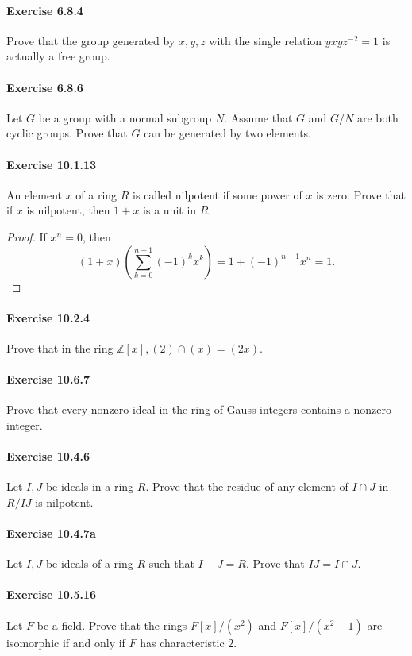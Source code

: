 \documentclass{article}
\begin{document}
\paragraph{Exercise 6.8.4} Prove that the group generated by $x, y, z$ with the single relation $y x y z^{-2}=1$ is actually a free group.


\paragraph{Exercise 6.8.6} Let $G$ be a group with a normal subgroup $N$. Assume that $G$ and $G / N$ are both cyclic groups. Prove that $G$ can be generated by two elements.


\paragraph{Exercise 10.1.13} An element $x$ of a ring $R$ is called nilpotent if some power of $x$ is zero. Prove that if $x$ is nilpotent, then $1+x$ is a unit in $R$.
\begin{proof}
    If $x^n=0$, then
$$
(1+x)\left(\sum_{k=0}^{n-1}(-1)^k x^k\right)=1+(-1)^{n-1} x^n=1 .
$$
\end{proof}



\paragraph{Exercise 10.2.4} Prove that in the ring $\mathbb{Z}[x],(2) \cap(x)=(2 x)$.


\paragraph{Exercise 10.6.7} Prove that every nonzero ideal in the ring of Gauss integers contains a nonzero integer.


\paragraph{Exercise 10.4.6} Let $I, J$ be ideals in a ring $R$. Prove that the residue of any element of $I \cap J$ in $R / I J$ is nilpotent.


\paragraph{Exercise 10.4.7a} Let $I, J$ be ideals of a ring $R$ such that $I+J=R$. Prove that $I J=I \cap J$.


\paragraph{Exercise 10.5.16} Let $F$ be a field. Prove that the rings $F[x] /\left(x^2\right)$ and $F[x] /\left(x^2-1\right)$ are isomorphic if and only if $F$ has characteristic $2 .$
\end{document}
